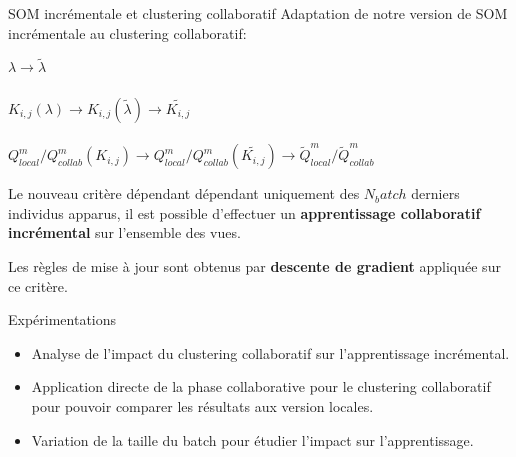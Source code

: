 \documentclass[hyperref={pdfpagelabels=false}]{beamer}
\begin{document}
        \begin{frame}{SOM incrémentale et clustering collaboratif}
            Adaptation de notre version de SOM incrémentale au clustering 
            collaboratif:
            \begin{center}
            $\lambda \rightarrow \widetilde{\lambda}$
            \\~\\
            $K_{i,j}(\lambda) \rightarrow K_{i,j}(\widetilde{\lambda}) 
            \rightarrow \widetilde{K_{i,j}}$
            \\~\\
            $Q_{local}^m / Q_{collab}^m (K_{i,j}) \rightarrow Q_{local}^m / 
            Q_{collab}^m (\widetilde{K_{i,j}}) \rightarrow 
            \widetilde{Q}_{local}^m / \widetilde{Q}_{collab}^m$
            \end{center}
            Le nouveau critère dépendant dépendant uniquement des $N_batch$ 
            derniers individus apparus, il est possible d'effectuer un 
            \textbf{apprentissage collaboratif incrémental} sur l'ensemble des 
            vues.

            Les règles de mise à jour sont obtenus par \textbf{descente de 
            gradient} appliquée sur ce critère.
        \end{frame}

        \begin{frame}{Expérimentations}
            \begin{itemize}
                \item Analyse de l'impact du clustering collaboratif sur
                    l'apprentissage incrémental.
                \item Application directe de la phase collaborative pour le
                    clustering collaboratif pour pouvoir comparer les
                    résultats aux version locales.
                \item Variation de la taille du batch pour étudier l'impact
                    sur l'apprentissage.
            \end{itemize}
        \end{frame}
        
\end{document}

